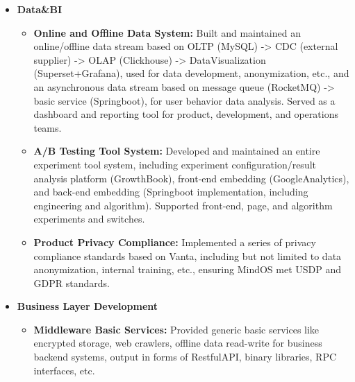 \documentclass[letterpaper,11pt]{article}
\begin{document}
\begin{spacing}{0.86}
\begin{itemize}
		\item
		\textbf{Data\&BI}
		\begin{itemize}
			\item
			\textbf{Online and Offline Data System: }Built and maintained an online/offline data stream based on OLTP (MySQL) -> CDC (external supplier) -> OLAP (Clickhouse) -> DataVisualization (Superset+Grafana), used for data development, anonymization, etc., and an asynchronous data stream based on message queue (RocketMQ) -> basic service (Springboot), for user behavior data analysis. Served as a dashboard and reporting tool for product, development, and operations teams.
			\item
			\textbf{A/B Testing Tool System: }Developed and maintained an entire experiment tool system, including experiment configuration/result analysis platform (GrowthBook), front-end embedding (GoogleAnalytics), and back-end embedding (Springboot implementation, including engineering and algorithm). Supported front-end, page, and algorithm experiments and switches.
			\item
			\textbf{Product Privacy Compliance: }Implemented a series of privacy compliance standards based on Vanta, including but not limited to data anonymization, internal training, etc., ensuring MindOS met USDP and GDPR standards.
		\end{itemize}
		
		\item
		\textbf{Business Layer Development}
		\begin{itemize}
			\item
			\textbf{Middleware Basic Services: }Provided generic basic services like encrypted storage, web crawlers, offline data read-write for business backend systems, output in forms of RestfulAPI, binary libraries, RPC interfaces, etc.
		\end{itemize}
	\end{itemize}
	

\end{spacing}
\end{document}
